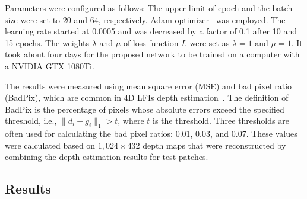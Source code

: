 \documentclass[]{spie}
\newcommand{\jtextd}[1]{}
\begin{document}
Parameters were configured as follows: 
The upper limit of epoch and the batch size were set to 20 and 64, respectively.
Adam optimizer~\cite{kingma2014adam} was employed.
The learning rate started at 0.0005 and was decreased by 
a factor of 0.1 after 10 and 15 epochs.
The weights $\lambda$ and $\mu$ of loss function $L$ were
set as $\lambda=1$ and $\mu=1$.
It took about four days for the proposed network to be trained on a
computer with a NVIDIA GTX 1080Ti.


\jtextd{
  提案手法の評価には，
  4D LFIs奥行き推定で一般的に適用される指標である，
  平均二乗誤差（Mean Square Error: MSE）と不良画素比（BadPix）を使用した~\cite{honauer2016benchmark}．
BadPixの定義は，絶対誤差が指定された閾値を超える，
  すなわち，$\|d_{i} - g_{i}\|_{1} > t$を満たす画素の比率である．
  ここで$t$は閾値であり，BadPixの計算には3つの閾値（0.07，0.03，0.01）がよく用いられる．
}

The results were measured
using mean square error (MSE) and bad pixel ratio (BadPix),
which are common in 4D LFIs depth estimation~\cite{honauer2016benchmark}.
The definition of BadPix is the percentage of pixels 
whose absolute errors exceed the specified threshold, 
i.e., $\|d_{i} - g_{i}\|_{1} > t$, 
where $t$ is the threshold.
Three thresholds are often used for calculating 
the bad pixel ratios: 0.01, 0.03, and 0.07.
These values were calculated based on $1,024 \times 432$ depth maps that
were reconstructed by combining the depth estimation results for test
patches.



\jtextd{
  本研究における評価では，各テストパッチから奥行きを推定し，空間軸に沿って結合した後，
  $432 \times 1024$の空間分解能を持つ奥行きマップを用いて
  各評価指標を計算したことに注意されたい．
}



\subsection{Results}
\end{document}
